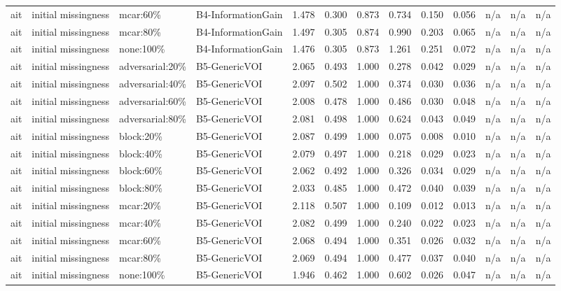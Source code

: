 \begin{table}[!ht]
{\begin{tabular}{lllllllllllll}
ait & initial missingness & mcar:60\% & B4-InformationGain & 1.478 & 0.300 & 0.873 & 0.734 & 0.150 & 0.056 & n/a & n/a & n/a \\
ait & initial missingness & mcar:80\% & B4-InformationGain & 1.497 & 0.305 & 0.874 & 0.990 & 0.203 & 0.065 & n/a & n/a & n/a \\
ait & initial missingness & none:100\% & B4-InformationGain & 1.476 & 0.305 & 0.873 & 1.261 & 0.251 & 0.072 & n/a & n/a & n/a \\
ait & initial missingness & adversarial:20\% & B5-GenericVOI & 2.065 & 0.493 & 1.000 & 0.278 & 0.042 & 0.029 & n/a & n/a & n/a \\
ait & initial missingness & adversarial:40\% & B5-GenericVOI & 2.097 & 0.502 & 1.000 & 0.374 & 0.030 & 0.036 & n/a & n/a & n/a \\
ait & initial missingness & adversarial:60\% & B5-GenericVOI & 2.008 & 0.478 & 1.000 & 0.486 & 0.030 & 0.048 & n/a & n/a & n/a \\
ait & initial missingness & adversarial:80\% & B5-GenericVOI & 2.081 & 0.498 & 1.000 & 0.624 & 0.043 & 0.049 & n/a & n/a & n/a \\
ait & initial missingness & block:20\% & B5-GenericVOI & 2.087 & 0.499 & 1.000 & 0.075 & 0.008 & 0.010 & n/a & n/a & n/a \\
ait & initial missingness & block:40\% & B5-GenericVOI & 2.079 & 0.497 & 1.000 & 0.218 & 0.029 & 0.023 & n/a & n/a & n/a \\
ait & initial missingness & block:60\% & B5-GenericVOI & 2.062 & 0.492 & 1.000 & 0.326 & 0.034 & 0.029 & n/a & n/a & n/a \\
ait & initial missingness & block:80\% & B5-GenericVOI & 2.033 & 0.485 & 1.000 & 0.472 & 0.040 & 0.039 & n/a & n/a & n/a \\
ait & initial missingness & mcar:20\% & B5-GenericVOI & 2.118 & 0.507 & 1.000 & 0.109 & 0.012 & 0.013 & n/a & n/a & n/a \\
ait & initial missingness & mcar:40\% & B5-GenericVOI & 2.082 & 0.499 & 1.000 & 0.240 & 0.022 & 0.023 & n/a & n/a & n/a \\
ait & initial missingness & mcar:60\% & B5-GenericVOI & 2.068 & 0.494 & 1.000 & 0.351 & 0.026 & 0.032 & n/a & n/a & n/a \\
ait & initial missingness & mcar:80\% & B5-GenericVOI & 2.069 & 0.494 & 1.000 & 0.477 & 0.037 & 0.040 & n/a & n/a & n/a \\
ait & initial missingness & none:100\% & B5-GenericVOI & 1.946 & 0.462 & 1.000 & 0.602 & 0.026 & 0.047 & n/a & n/a & n/a \\

\end{tabular}}
\end{table}
